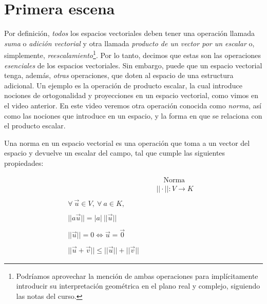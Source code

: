 \documentclass[12pt,dvipsnames]{article}
\numberwithin{equation}{section}
\begin{document}

\newpage
\section{Primera escena}

Por definición, \emph{todos} los espacios vectoriales deben tener una operación llamada \emph{suma} o \emph{adición vectorial} y otra llamada \emph{producto de un vector por un escalar} o, simplemente, \emph{reescalamiento}\footnote{Podríamos aprovechar la mención de ambas operaciones para implícitamente introducir su interpretación geométrica en el plano real y complejo, siguiendo las notas del curso.}. Por lo tanto, decimos que estas son las operaciones \emph{esenciales} de los espacios vectoriales. Sin embargo, puede que un espacio vectorial tenga, además, \emph{otras} operaciones, que doten al espacio de una estructura adicional. Un ejemplo es la operación de producto escalar, la cual introduce nociones de ortogonalidad y proyecciones en un espacio vectorial, como vimos en el video anterior. En este video veremos otra operación conocida como \emph{norma}, así como las nociones que introduce en un espacio, y la forma en que se relaciona con el producto escalar.

Una norma en un espacio vectorial es una operación que toma a un vector del espacio y devuelve un escalar del campo, tal que cumple las siguientes propiedades:

\begin{align*}
     & & &\quad \text{Norma}& \\
     & & &||\cdot||:V\to K& \\
     \\
     \forall \ \vec{u}\in V, \ \forall \ a\in K, \\
     \\
     ||a\vec{u}|| = |a| \ ||\vec{u}||\\
     \\
     ||\vec{u}|| = 0 \iff \vec{u} = \vec{0}\\
     \\
     ||\vec{u}+\vec{v}|| \le ||\vec{u}|| + ||\vec{v}||
\end{align*}
\end{document}
